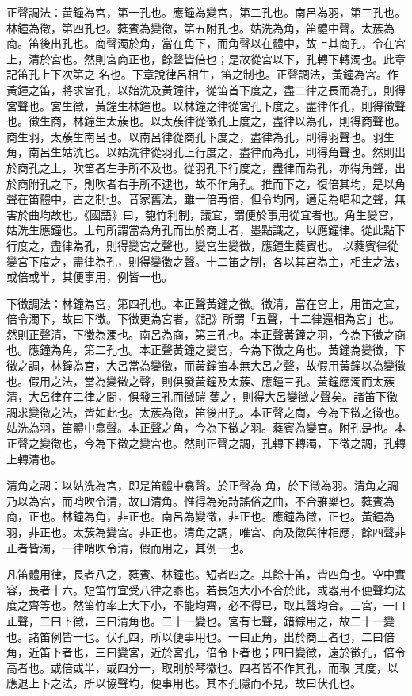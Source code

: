 \begin{pinyinscope}
 正聲調法：黃鐘為宮，第一孔也。應鐘為變宮，第二孔也。南呂為羽，第三孔也。林鐘為徵，第四孔也。蕤賓為變徵，第五附孔也。姑洗為角，笛體中聲。太蔟為商。笛後出孔也。商聲濁於角，當在角下，而角聲以在體中，故上其商孔，令在宮上，清於宮也。然則宮商正也，餘聲皆倍也；是故從宮以下，孔轉下轉濁也。此章記笛孔上下次第之
 名也。下章說律呂相生，笛之制也。正聲調法，黃鐘為宮。作黃鐘之笛，將求宮孔，以始洗及黃鐘律，從笛首下度之，盡二律之長而為孔，則得宮聲也。宮生徵，黃鐘生林鐘也。以林鐘之律從宮孔下度之。盡律作孔，則得徵聲也。徵生商，林鐘生太蔟也。以太蔟律從徵孔上度之，盡律以為孔，則得商聲也。商生羽，太蔟生南呂也。以南呂律從商孔下度之，盡律為孔，則得羽聲也。羽生角，南呂生姑洗也。以姑洗律從羽孔上行度之，盡律而為孔，則得角聲也。然則出於商孔之上，吹笛者左手所不及也。從羽孔下行度之，盡律而為孔，亦得角聲，出於商附孔之下，則吹者右手所不逮也，故不作角孔。推而下之，復倍其均，是以角聲在笛體中，古之制也。音家舊法，雖一倍再倍，但令均同，適足為唱和之聲，無害於曲均故也。《國語》曰，匏竹利制，議宜，謂便於事用從宜者也。角生變宮，姑洗生應鐘也。上句所謂當為角孔而出於商上者，墨點識之，以應鐘律。從此點下行度之，盡律為孔，則得變宮之聲也。變宮生變徵，應鐘生蕤賓也。
 以蕤賓律從變宮下度之，盡律為孔，則得變徵之聲。十二笛之制，各以其宮為主，相生之法，或倍或半，其便事用，例皆一也。



 下徵調法：林鐘為宮，第四孔也。本正聲黃鐘之徵。徵清，當在宮上，用笛之宜，倍令濁下，故曰下徵。下徵更為宮者，《記》所謂「五聲，十二律還相為宮」也。然則正聲清，下徵為濁也。南呂為商，第三孔也。本正聲黃鐘之羽，今為下徵之商也。應鐘為角，第二孔也。本正聲黃鐘之變宮，今為下徵之角也。黃鐘為變徵，下徵之調，林鐘為宮，大呂當為變徵，而黃鐘笛本無大呂之聲，故假用黃鐘以為變徵也。假用之法，當為變徵之聲，則俱發黃鐘及太蔟、應鐘三孔。黃鐘應濁而太蔟清，大呂律在二律之間，俱發三孔而徵磑蒦之，則得大呂變徵之聲矣。諸笛下徵調求變徵之法，皆如此也。太蔟為徵，笛後出孔。本正聲之商，今為下徵之徵也。姑洗為羽，笛體中翕聲。本正聲之角，今為下徵之羽。蕤賓為變宮。附孔是也。本正聲之變徵也，今為下徵之變宮也。然則正聲之調，孔轉下轉濁，下徵之調，孔轉上轉清也。



 清角之調：以姑洗為宮，即是笛體中翕聲。於正聲為
 角，於下徵為羽。清角之調乃以為宮，而哨吹令清，故曰清角。惟得為宛詩謠俗之曲，不合雅樂也。蕤賓為商，正也。林鐘為角，非正也。南呂為變徵，非正也。應鐘為徵，正也。黃鐘為羽，非正也。太蔟為變宮。非正也。清角之調，唯宮、商及徵與律相應，餘四聲非正者皆濁，一律哨吹令清，假而用之，其例一也。



 凡笛體用律，長者八之，蕤賓、林鐘也。短者四之。其餘十笛，皆四角也。空中實容，長者十六。短笛竹宜受八律之黍也。若長短大小不合於此，或器用不便聲均法度之齊等也。然笛竹率上大下小，不能均齊，必不得已，取其聲均合。三宮，一曰正聲，二曰下徵，三曰清角也。二十一變也。宮有七聲，錯綜用之，故二十一變也。諸笛例皆一也。伏孔四，所以便事用也。一曰正角，出於商上者也，二曰倍角，近笛下者也，三曰變宮，近於宮孔，倍令下者也；四曰變徵，遠於徵孔，倍令高者也。或倍或半，或四分一，取則於琴徽也。四者皆不作其孔，而取
 其度，以應退上下之法，所以協聲均，便事用也。其本孔隱而不見，故曰伏孔也。




\end{pinyinscope}

